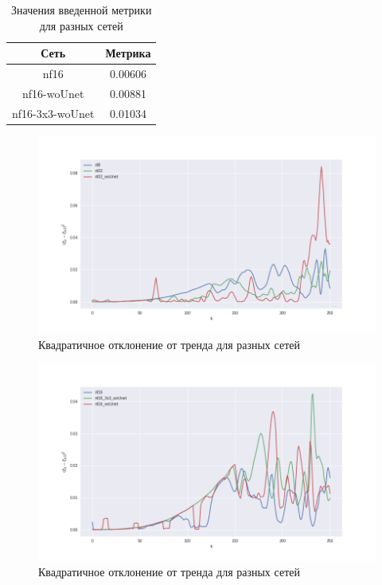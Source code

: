 \documentclass[a4paper]{article}
\begin{document}
			\begin{table}[h]
				\begin{center}
					\begin{tabular}{|c|c|}
						\hline
						Сеть & Метрика \\
						\hline
						nf16 & 0.00606\\
						\hline
						nf16-woUnet & 0.00881\\
						\hline
						nf16-3x3-woUnet & 0.01034\\
						\hline
					\end{tabular}
					\caption{Значения введенной метрики для разных сетей}
				\end{center}
			\end{table}
			\begin{center}
				\begin{figure}[h]
					\includegraphics[width=0.95\linewidth,height=0.5\textwidth]{earr_1}
					\caption{Квадратичное отклонение от тренда для разных сетей}
				\end{figure}
				\begin{figure}[h]
					\includegraphics[width=0.95\linewidth,height=0.5\textwidth]{earr_2}
					\caption{Квадратичное отклонение от тренда для разных сетей}
					\end{figure}
			\end{center}
\end{document}
